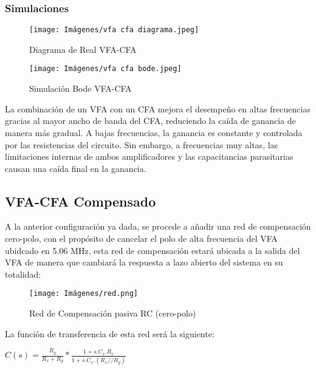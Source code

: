     \subsubsection{Simulaciones}
\begin{figure}[H]
    \centering
    \begin{minipage}{0.48\textwidth}
        \centering
        \texttt{[image: Imágenes/vfa cfa diagrama.jpeg]}
        \caption{Diagrama de Real VFA-CFA}
        \label{fig:diagrama_vos}
    \end{minipage}
    \hfill
    \begin{minipage}{0.48\textwidth}
        \centering
        \texttt{[image: Imágenes/vfa cfa bode.jpeg]}
        \caption{Simulación Bode VFA-CFA}
        \label{fig:simu_vos}
    \end{minipage}
\end{figure}
La combinación de un VFA con un CFA mejora el desempeño en altas frecuencias gracias al mayor ancho de banda del CFA, reduciendo la caída de ganancia de manera más gradual. A bajas frecuencias, la ganancia es constante y controlada por las resistencias del circuito. Sin embargo, a frecuencias muy altas, las limitaciones internas de ambos amplificadores y las capacitancias parasitarias causan una caída final en la ganancia.

    \subsection{VFA-CFA Compensado}
    
    A la anterior configuración ya dada, se procede a añadir una red de compensación cero-polo, con el propósito de cancelar el polo de alta frecuencia del VFA ubidcado en 5.06 MHz, esta red de compensación estará ubicada a la salida del VFA de manera que cambiará la respuesta a lazo abierto del sistema en su totalidad:

    \begin{figure}[ht]
        \centering
        \texttt{[image: Imágenes/red.png]}
        \caption{Red de Compensación pasiva RC (cero-polo)}
    \end{figure}

    La función de transferencia de esta red será la siguiente:

    \begin{center}
        $C(s) = \frac{R_y}{R_x + R_y} * \frac{ 1 + s.C_x.R_x}{ 1 + s.C_x.(R_x//R_y)}$
    \end{center}

